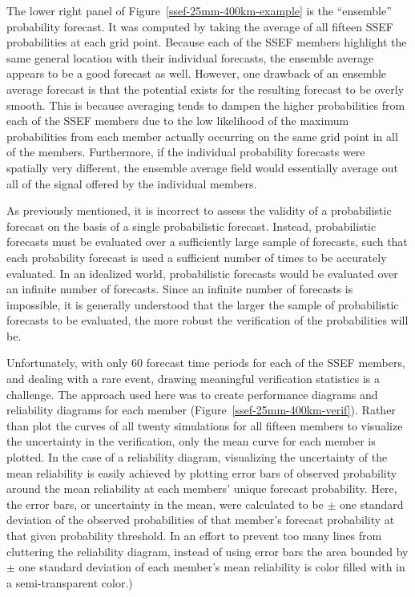 The lower right panel of \mbox{Figure \ref{ssef-25mm-400km-example}} is the ``ensemble'' probability forecast.
It was computed by taking the average of all fifteen SSEF probabilities at each grid point.
Because each of the SSEF members highlight the same general location with their individual forecasts, the ensemble average appears to be a good forecast as well.
However, one drawback of an ensemble average forecast is that the potential exists for the resulting forecast to be overly smooth.
This is because averaging tends to dampen the higher probabilities from each of the SSEF members due to the low likelihood of the maximum probabilities from each member actually occurring on the same grid point in all of the members.
Furthermore, if the individual probability forecasts were spatially very different, the ensemble average field would essentially average out all of the signal offered by the individual members.


As previously mentioned, it is incorrect to assess the validity of a probabilistic forecast on the basis of a single probabilistic forecast.
Instead, probabilistic forecasts must be evaluated over a sufficiently large sample of forecasts, such that each probability forecast is used a sufficient number of times to be accurately evaluated.
In an idealized world, probabilistic forecasts would be evaluated over an infinite number of forecasts.
Since an infinite number of forecasts is impossible, it is generally understood that the larger the sample of probabilistic forecasts to be evaluated, the more robust the verification of the probabilities will be.


Unfortunately, with only 60 forecast time periods for each of the SSEF members, and dealing with a rare event, drawing meaningful verification statistics is a challenge.
The approach used here was to create performance diagrams and reliability diagrams for each member (\mbox{Figure \ref{ssef-25mm-400km-verif}}).
Rather than plot the curves of all twenty simulations for all fifteen members to visualize the uncertainty in the verification, only the mean curve for each member is plotted.
In the case of a reliability diagram, visualizing the uncertainty of the mean reliability is easily achieved by plotting error bars of observed probability around the mean reliability at each members' unique forecast probability.
Here, the error bars, or uncertainty in the mean, were calculated to be $\pm$ one standard deviation of the observed probabilities of that member's forecast probability at that given probability threshold.
In an effort to prevent too many lines from cluttering the reliability diagram, instead of using error bars the area bounded by $\pm$ one standard deviation of each member's mean reliability is color filled with in a semi-transparent color.)


